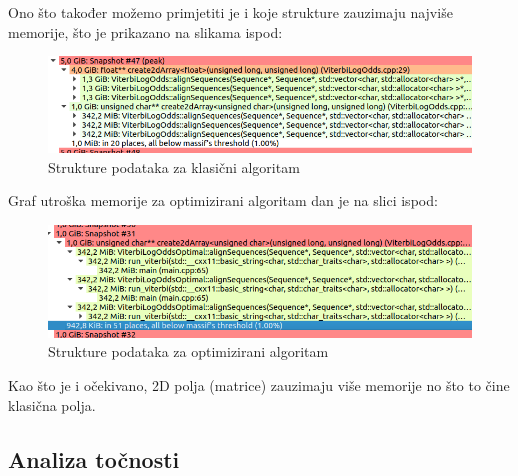 \documentclass[a4paper]{article}
\begin{document}
Ono što također možemo primjetiti je i koje strukture zauzimaju najviše memorije, što je prikazano na slikama ispod:
\begin{figure}[H]
\centering
\includegraphics[width=\linewidth]{variables-classic.png}
\caption{Strukture podataka za klasični algoritam}
\end{figure}

Graf utroška memorije za optimizirani algoritam dan je na slici ispod:
\begin{figure}[H]
\centering
\includegraphics[width=\linewidth]{variables-optimal.png}
\caption{Strukture podataka za optimizirani algoritam}
\end{figure}

Kao što je i očekivano, 2D polja (matrice) zauzimaju više memorije no što to čine klasična polja.

\subsection{Analiza točnosti}
\end{document}
